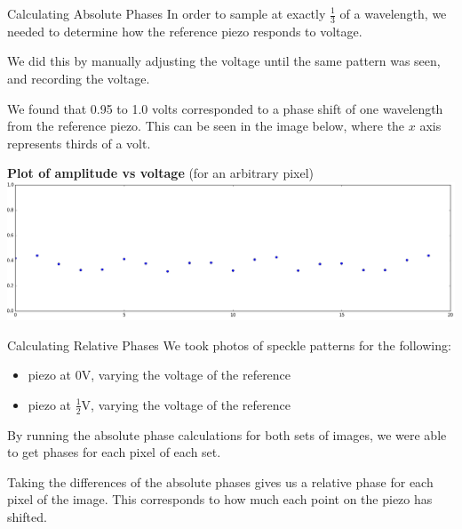 \documentclass[pdf]{beamer}
\begin{document}
\begin{frame}{Calculating Absolute Phases}
In order to sample at exactly $\frac13$ of a wavelength, we needed to determine how the reference piezo responds to voltage.

We did this by manually adjusting the voltage until the same pattern was seen, and recording the voltage.

\vspace{.3cm}
We found that 0.95 to 1.0 volts corresponded to a phase shift of one wavelength from the reference piezo. This can be seen in the image below, where the $x$ axis represents thirds of a volt.

\begin{center}
{\bf Plot of amplitude vs voltage}
(for an arbitrary pixel)
\includegraphics[width=\textwidth]{cosine_check.png}
\end{center}


\end{frame}

\begin{frame}{Calculating Relative Phases}
We took photos of speckle patterns for the following:
\begin{itemize}
	\item piezo at 0V, varying the voltage of the reference
	\item piezo at $\frac12$V, varying the voltage of the reference
\end{itemize}
By running the absolute phase calculations for both sets of images, we were able to get phases for each pixel of each set.

\vspace{0.3cm}
Taking the differences of the absolute phases gives us a relative phase for each pixel of the image. This corresponds to how much each point on the piezo has shifted.
\end{frame}
\end{document}
